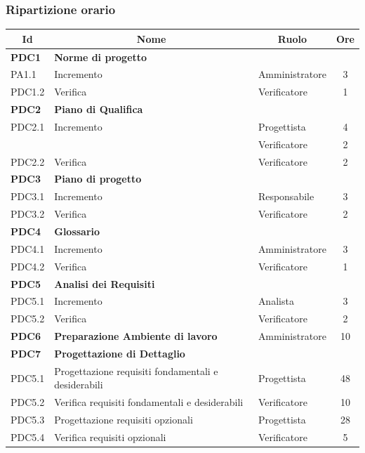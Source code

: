 \subsubsection{Ripartizione orario}
\begin{table}[H]
	\centering
	\begin{tabular*}{1\textwidth}{ @{\extracolsep{\fill} } l l l c  }
	\hline
	\multicolumn{1}{c}{\textbf{Id}} & 
	\multicolumn{1}{c}{\textbf{Nome}} & 
	\multicolumn{1}{c}{\textbf{Ruolo}}& 
	\multicolumn{1}{c}{\textbf{Ore}} \\
	\hline
	
	\textbf{PDC1} & \textbf{Norme di progetto} \\
	\cline{3-4}
	PA1.1 & Incremento & Amministratore & 3\\ 
        \cline{3-4}
	PDC1.2 & Verifica & Verificatore & 1\\
	
	\hline
	\textbf{PDC2} & \textbf{Piano di Qualifica} \\
	\cline{3-4}
	PDC2.1 & Incremento & Progettista & 4\\
        & & Verificatore & 2\\
        \cline{3-4}
	PDC2.2 & Verifica & Verificatore & 2\\
	
	\hline
	\textbf{PDC3}  & \textbf{Piano di progetto} \\
	\cline{3-4}
	PDC3.1 & Incremento & Responsabile & 3\\ 
        \cline{3-4}
	PDC3.2 & Verifica & Verificatore & 2\\

	\hline
	\textbf{PDC4} & \textbf{Glossario} \\
	\cline{3-4}
	PDC4.1 & Incremento & Amministratore & 3\\ 
        \cline{3-4}
	PDC4.2 & Verifica & Verificatore & 1\\

        \hline
        \textbf{PDC5} & \textbf{Analisi dei Requisiti}\\
        \cline{3-4}
        PDC5.1 & Incremento & Analista & 3\\
        \cline{3-4}
        PDC5.2 & Verifica & Verificatore & 2\\

        \hline
        \textbf{PDC6} & \textbf{Preparazione Ambiente di lavoro} & Amministratore & 10\\

        \hline
        \textbf{PDC7} & \textbf{Progettazione di Dettaglio} \\
	\cline{3-4}
	PDC5.1 & Progettazione requisiti fondamentali e desiderabili & Progettista & 48\\ 
        \cline{3-4}
	PDC5.2 & Verifica requisiti fondamentali e desiderabili & Verificatore & 10\\
        \cline{3-4}
	PDC5.3 & Progettazione requisiti opzionali & Progettista & 28\\
        \cline{3-4}
	PDC5.4 & Verifica requisiti opzionali & Verificatore & 5\\


\end{tabular*}
\end{table}
